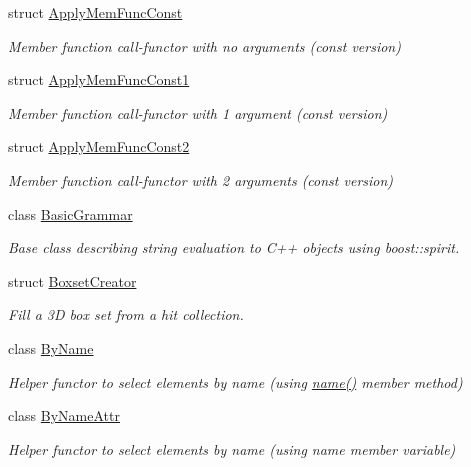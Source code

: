 \begin{DoxyCompactItemize}
struct \hyperlink{struct_d_d4hep_1_1_apply_mem_func_const}{Apply\+Mem\+Func\+Const}
\begin{DoxyCompactList}\small\item\em Member function call-\/functor with no arguments (const version) \end{DoxyCompactList}\item 
struct \hyperlink{struct_d_d4hep_1_1_apply_mem_func_const1}{Apply\+Mem\+Func\+Const1}
\begin{DoxyCompactList}\small\item\em Member function call-\/functor with 1 argument (const version) \end{DoxyCompactList}\item 
struct \hyperlink{struct_d_d4hep_1_1_apply_mem_func_const2}{Apply\+Mem\+Func\+Const2}
\begin{DoxyCompactList}\small\item\em Member function call-\/functor with 2 arguments (const version) \end{DoxyCompactList}\item 
class \hyperlink{class_d_d4hep_1_1_basic_grammar}{Basic\+Grammar}
\begin{DoxyCompactList}\small\item\em Base class describing string evaluation to C++ objects using boost\+::spirit. \end{DoxyCompactList}\item 
struct \hyperlink{struct_d_d4hep_1_1_boxset_creator}{Boxset\+Creator}
\begin{DoxyCompactList}\small\item\em Fill a 3D box set from a hit collection. \end{DoxyCompactList}\item 
class \hyperlink{class_d_d4hep_1_1_by_name}{By\+Name}
\begin{DoxyCompactList}\small\item\em Helper functor to select elements by name (using \hyperlink{class_d_d4hep_1_1_by_name_a06f4c668c9195f670ee1ace07191efa1}{name()} member method) \end{DoxyCompactList}\item 
class \hyperlink{class_d_d4hep_1_1_by_name_attr}{By\+Name\+Attr}
\begin{DoxyCompactList}\small\item\em Helper functor to select elements by name (using name member variable) \end{DoxyCompactList}\item 

\end{DoxyCompactItemize}

